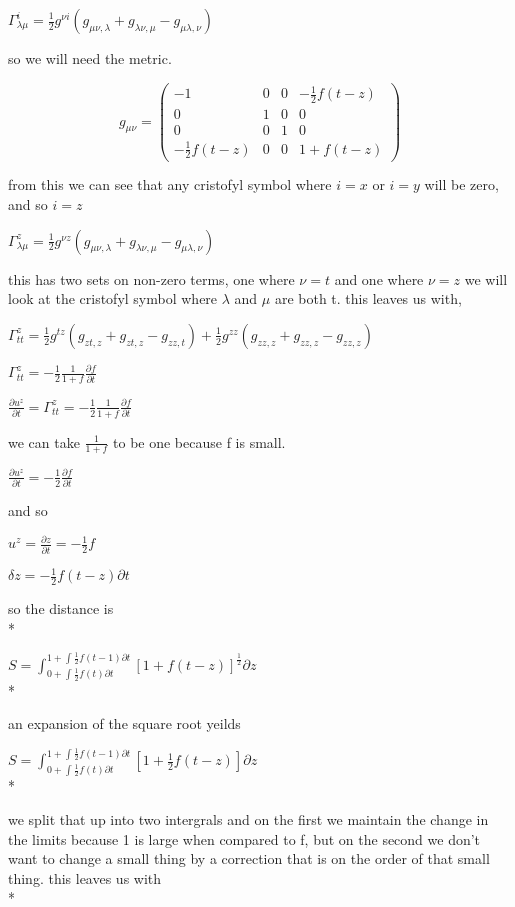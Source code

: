 \documentclass{article}
\begin{document}
$\Gamma^{i}_{\lambda\mu}=\frac{1}{2}g^{\nu i}(g_{\mu\nu,\lambda}+g_{\lambda\nu,\mu}-g_{\mu\lambda,\nu})$

so we will need the metric. 

\[ g_{\mu\nu} = \left( \begin{array}{cccc}
-1 & 0 & 0 & -\frac{1}{2}f(t-z) \\
0 & 1 & 0 & 0 \\
0 & 0 & 1 & 0 \\
-\frac{1}{2}f(t-z) & 0 & 0 & 1+f(t-z) \end{array} \right)\] 

from this we can see that any cristofyl symbol where $i=x$ or $i=y$ will be zero, and so $i=z$

$\Gamma^{z}_{\lambda\mu}=\frac{1}{2}g^{\nu z}(g_{\mu\nu,\lambda}+g_{\lambda\nu,\mu}-g_{\mu\lambda,\nu})$

this has two sets on non-zero terms, one where $\nu=t$ and one where $\nu=z$ we will look at the cristofyl symbol where $\lambda$ and $\mu$ are both t. this leaves us with, 

$\Gamma^{z}_{tt}=\frac{1}{2}g^{tz}(g_{zt,z}+g_{zt,z}-g_{zz,t})+\frac{1}{2}g^{zz}(g_{zz,z}+g_{zz,z}-g_{zz,z})$

$\Gamma^{z}_{tt}=-\frac{1}{2}\frac{1}{1+f}\frac{\partial f}{\partial t}$

$\frac{\partial u^{z}}{\partial t}=\Gamma^{z}_{tt}=-\frac{1}{2}\frac{1}{1+f}\frac{\partial f}{\partial t}$

we can take $\frac{1}{1+f}$ to be one because f is small. 

$\frac{\partial u^{z}}{\partial t}=-\frac{1}{2}\frac{\partial f}{\partial t}$

and so 

$u^{z}=\frac{\partial z}{\partial t}=-\frac{1}{2} f$

$\delta z=-\frac{1}{2}f(t-z)\partial t$

so the distance is 
\\*

$S=\int_{0+\int \frac{1}{2}f(t)\partial t}^{1+\int \frac{1}{2}f(t-1)\partial t}[1+f(t-z)]^{\frac{1}{2}}\partial z$
\\*

an expansion of the square root yeilds 

$S=\int_{0+\int \frac{1}{2}f(t)\partial t}^{1+\int \frac{1}{2}f(t-1)\partial t}[1+\frac{1}{2}f(t-z)]\partial z$
\\*

we split that up into two intergrals and on the first we maintain the change in the limits because 1 is large when compared to f, but on the second we don't want to change a small thing by a correction that is on the order of that small thing. this leaves us with 
\\*
\end{document}
